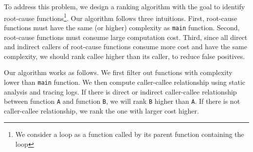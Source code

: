 To address this problem, we design a ranking algorithm 
with the goal to identify root-cause functions\footnote{We consider a loop 
as a function called by its parent function containing the loop}. 
Our algorithm follows three intuitions. 
First, root-cause functions must have the same (or higher) 
complexity as \texttt{main} function.
Second, root-cause functions must consume large computation cost.
Third, since all direct and indirect callers of root-cause functions 
consume more cost and have the same complexity, 
we should rank callee higher than its caller, 
to reduce false positives. 

Our algorithm works as follows. 
We first filter out functions with complexity lower than \texttt{main} function.
We then compute caller-callee relationship using static analysis and tracing logs. 
If there is direct or indirect caller-callee relationship 
between function \texttt{A}
and function \texttt{B}, we will rank \texttt{B} higher than \texttt{A}.
If there is not caller-callee relationship,
we rank the one with larger cost higher.


